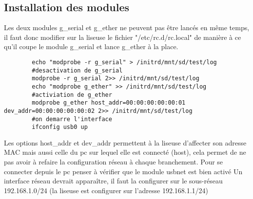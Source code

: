 \subsection{Installation des modules}	
	Les deux modules g_serial et g_ether ne peuvent pas être lancés en même temps, il faut donc modifier sur la liseuse le fichier "/etc/rc.d/rc.local" de manière à ce qu'il coupe le module g_serial et lance g_ether à la place.
	\begin{verbatim}
		echo "modprobe -r g_serial" > /initrd/mnt/sd/test/log
		#desactivation de g_serial
		modprobe -r g_serial 2>> /initrd/mnt/sd/test/log
		echo "modprobe g_ether" >> /initrd/mnt/sd/test/log
		#activiation de g_ether
		modprobe g_ether host_addr=00:00:00:00:00:01 dev_addr=00:00:00:00:00:02 2>> /initrd/mnt/sd/test/log
		#on demarre l'interface
		ifconfig usb0 up
	\end{verbatim}
	Les options host_addr et dev_addr permettent à la liseuse d'affecter son adresse MAC mais aussi celle du pc sur lequel elle est connecté (host), cela permet de ne pas avoir à refaire la configuration réseau à chaque branchement.	
	Pour se connecter depuis le pc penser à vérifier que le module usbnet est bien activé	
	Un interface réseau devrait apparaître, il faut la configurer sur le sous-réseau 192.168.1.0/24 (la liseuse est configurer sur l'adresse 192.168.1.1/24)
	
